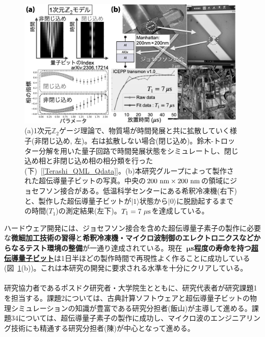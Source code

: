 \documentclass[11pt,a4j,dvipdfmx]{jarticle} 					%
\newcommand{\研究課題名}{誤り耐性量子コンピュータに向けた誤り訂正技術の開発(仮)}
\newcommand{\研究機関名}{東京大学}
\newcommand{\研究代表者氏名}{寺師弘二}
\newcommand{\研究期間の最終元号年度}{10}  %
\newcommand{\mybf}[1]{{\bfseries\sffamily#1}}
\newcommand{\maruone}{\raise0.2mm\hbox{\textcircled{\scriptsize{1}}}}
\newcommand{\marutwo}{\raise0.2mm\hbox{\textcircled{\scriptsize{2}}}}
\newcommand{\maruthree}{\raise0.2mm\hbox{\textcircled{\scriptsize{3}}}}
\newcommand{\marufour}{\raise0.2mm\hbox{\textcircled{\scriptsize{4}}}}
\begin{document}
\begin{figure}
	\begin{center}
		\vspace{-1cm}
		\includegraphics[width=11cm]{figs/result.png}\vspace{-0.4cm}
		\caption{\small{(a)1次元$\mathbb{Z}_2$ゲージ理論で、物質場が時間発展と共に拡散していく様子(非閉じ込め, 左)。右は拡散しない場合(閉じ込め)。鈴木-トロッター分解を用いた量子回路で時間発展状態をシミュレートし、閉じ込め相と非閉じ込め相の相分類を行った(下)~[\ref{Terashi_QML_Qdata}]。(b)本研究グループによって製作された超伝導量子ビットの写真。中央の$200~{\rm nm}\times200~{\rm nm}$の領域にジョセフソン接合がある。低温科学センターにある希釈冷凍機(右下)と、製作した超伝導量子ビットが$|1\rangle$状態から$|0\rangle$に脱励起するまでの時間($T_1$)の測定結果(左下)。$T_1=7~\mu{\rm s}$を達成している。}
		\label{fig:status}}\vspace{-1cm}
	\end{center}
\end{figure}

ハードウェア開発には、ジョセフソン接合を含めた超伝導量子素子の製作に必要な\mybf{微細加工技術の習得}と\mybf{希釈冷凍機・マイクロ波制御のエレクトロニクスなどからなるテスト環境の整備}が一通り達成されている。現在\mybf{10~$\boldsymbol{\mu}$s程度の寿命を持つ\ul{超伝導量子ビット}}は1日半ほどの製作時間で再現性よく作ることに成功している(図~\ref{fig:status}(b))。これは本研究の開発に要求される水準を十分にクリアしている。 \vspace{-3mm}\\


\\
研究協力者であるポスドク研究者・大学院生とともに、研究代表者が研究課題{\maruone}を担当する。課題{\marutwo}については、古典計算ソフトウェアと超伝導量子ビットの物理シミュレーションの知識が豊富である研究分担者(飯山)が主導して進める。課題{\maruthree}{\marufour}については、超伝導量子素子の製作に成功し、マイクロ波のエンジニアリング技術にも精通する研究分担者(陳)が中心となって進める。
\end{document}
